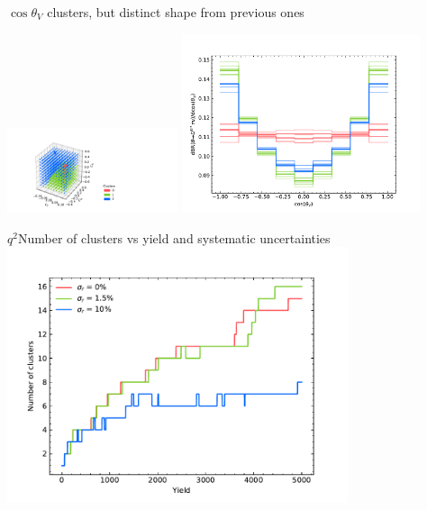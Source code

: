 \begin{frame}{$\cos\theta_V$}
	 clusters, but distinct shape from previous ones
	\begin{changemargin}{-1cm}{-1cm}
		{\includegraphics[width=5cm,clip,trim=3cm 0.3cm 7.5cm 1cm]{figures/from-paper/cosV_3D.pdf}}
		{\includegraphics[width=7cm,clip,trim=0.3cm 0.cm 1.5cm 0cm]{figures/from-paper/cosV_dist.pdf}}
	\end{changemargin}
\end{frame}
%
\begin{frame}{$q^2$}{Number of clusters vs yield and systematic uncertainties}
	\centering
	\includegraphics[width=10cm]{figures/from-paper/clust_yield.pdf}
\end{frame}
%
